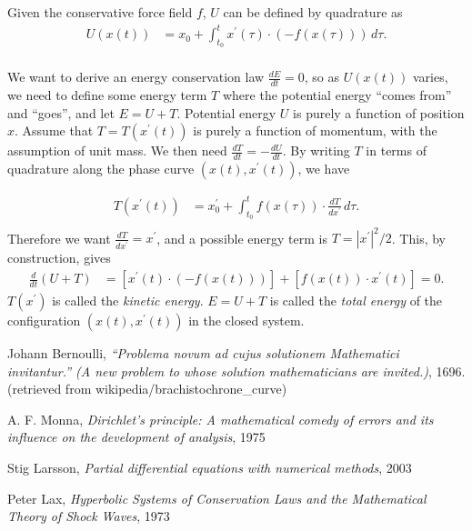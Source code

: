 \documentclass{article}
\newcommand{\pr}{\prime}
\begin{document}
Given the conservative force field $f$, $U$ can be defined by quadrature as
\begin{equation}
\begin{split}
    U(x(t)) &= x_0 + \int_{t_0}^t x^\pr(\tau) \cdot(-f(x(\tau)))\, d\tau. \\
\end{split}
\end{equation}

We want to derive an energy conservation law $\frac{dE}{dt} = 0$, so as $U(x(t))$ varies, we need to define
some energy term $T$ where the potential energy ``comes from'' and ``goes'', and let $E = U + T$.
Potential energy $U$ is purely a function of position $x$. Assume that $T = T(x^\pr(t))$ is purely a function of momentum, with the assumption of unit mass.
We then need $\frac{dT}{dt} = -\frac{dU}{dt}$. By writing $T$ in terms of quadrature along the phase curve $(x(t),x^\pr(t))$, we have

\begin{equation}
\begin{split}
    T(x^\pr(t)) &= x_0^\pr + \int_{t_0}^t f(x(\tau)) \cdot \frac{dT}{dx^\pr}\, d\tau. \\
\end{split}
\end{equation}
Therefore we want $\frac{dT}{dx^\pr} = x^\pr$, and a possible energy term is $T = |x^\pr|^2/2$.
This, by construction, gives
\begin{equation}
\begin{split}
    \frac{d}{dt}\left(U + T\right) &= \left[x^\pr(t)\cdot (-f(x(t)))\right] + \left[f(x(t))\cdot x^\pr(t)\right] = 0.
\end{split}
\end{equation}
$T(x^\pr)$ is called the \textit{kinetic energy}. $E = U + T$ is called the \textit{total energy} of the configuration $(x(t), x^\pr(t))$ in the closed system.





\begin{thebibliography}{9}
Johann Bernoulli, \textit{``Problema novum ad cujus solutionem Mathematici invitantur.'' (A new problem to whose solution mathematicians are invited.)}, 1696.
(retrieved from wikipedia/brachistochrone\_curve)

A. F. Monna, \textit{Dirichlet's principle: A mathematical comedy of errors and its influence on the development of analysis}, 1975


Stig Larsson, \textit{Partial differential equations with numerical methods}, 2003

Peter Lax, \textit{Hyperbolic Systems of Conservation Laws and the Mathematical Theory of Shock Waves}, 1973


\end{thebibliography}
\end{document}
